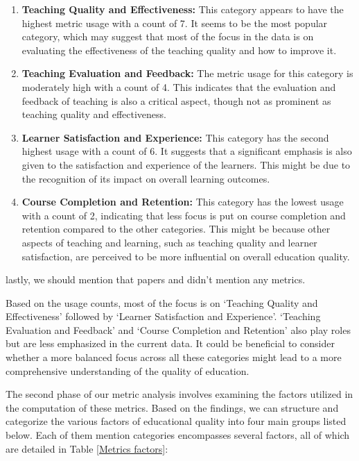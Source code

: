 \begin{enumerate}
\item \textbf{Teaching Quality and Effectiveness:} This category appears to have the highest metric usage with a count of 7. It seems to be the most popular category, which may suggest that most of the focus in the data is on evaluating the effectiveness of the teaching quality and how to improve it.
\item \textbf{Teaching Evaluation and Feedback:} The metric usage for this category is moderately high with a count of 4. This indicates that the evaluation and feedback of teaching is also a critical aspect, though not as prominent as teaching quality and effectiveness.
\item \textbf{Learner Satisfaction and Experience:} This category has the second highest usage with a count of 6. It suggests that a significant emphasis is also given to the satisfaction and experience of the learners. This might be due to the recognition of its impact on overall learning outcomes.
\item \textbf{Course Completion and Retention:} This category has the lowest usage with a count of 2, indicating that less focus is put on course completion and retention compared to the other categories. This might be because other aspects of teaching and learning, such as teaching quality and learner satisfaction, are perceived to be more influential on overall education quality.
\end{enumerate}

lastly, we should mention that papers\cite{Evaluation_Model_of_PE_Teaching_Quality_Based_on_Active_Learning_Support_Vector_Machine} and \cite{Sentiment_analysis_of_student_feedback_using_machine_learning_and_lexicon-based_approaches} didn't mention any metrics.

Based on the usage counts, most of the focus is on `Teaching Quality and Effectiveness' followed by `Learner Satisfaction and Experience'. `Teaching Evaluation and Feedback' and `Course Completion and Retention' also play roles but are less emphasized in the current data. It could be beneficial to consider whether a more balanced focus across all these categories might lead to a more comprehensive understanding of the quality of education.

The second phase of our metric analysis involves examining the factors utilized in the computation of these metrics. Based on the findings, we can structure and categorize the various factors of educational quality into four main groups listed below. Each of them mention categories encompasses several factors, all of which are detailed in Table \ref{Metrics factors}:

